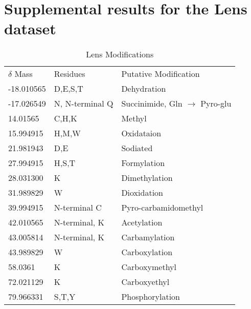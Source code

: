 \setcounter{page}{1}
\setcounter{figure}{0}  %

\section{Supplemental results for the Lens dataset}

\begin{table}[h]
\centering
\caption{Lens Modifications}\label{tbl:lensModifications}

\begin{tabular}{|l|l|l|}
\hline
$\delta$ Mass & Residues & Putative Modification \\
-18.010565 & D,E,S,T & Dehydration \\
-17.026549 & N, N-terminal Q & Succinimide, Gln $\rightarrow$ Pyro-glu \\
14.01565 & C,H,K & Methyl \\
15.994915 & H,M,W & Oxidataion \\
21.981943 & D,E & Sodiated \\
27.994915 & H,S,T & Formylation \\
28.031300 & K & Dimethylation \\
31.989829 & W & Dioxidation \\
39.994915 & N-terminal C & Pyro-carbamidomethyl \\
42.010565 & N-terminal, K & Acetylation \\
43.005814 & N-terminal, K & Carbamylation \\
43.989829 & W & Carboxylation \\ 
58.0361 & K	& Carboxymethyl \\
72.021129 & K & Carboxyethyl \\
79.966331 & S,T,Y & Phosphorylation \\
\hline
\end{tabular}
\end{table}


